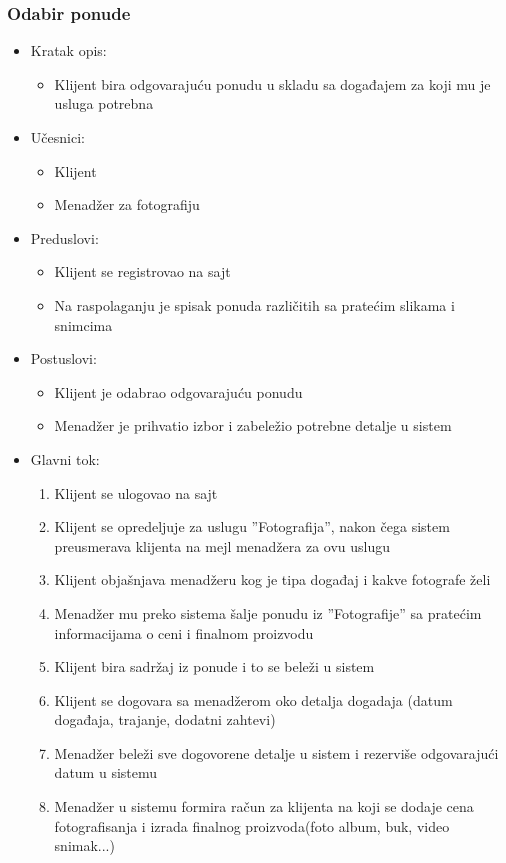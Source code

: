 \documentclass[a4paper]{article}
\begin{document}
\subsubsection{Odabir ponude}
\begin{itemize}
    \item Kratak opis: 
    \begin{itemize}
        \item Klijent bira odgovarajuću ponudu u skladu sa događajem za koji mu je usluga potrebna
    \end{itemize}
    \item Učesnici:
        \begin{itemize}
        \item Klijent
        \item Menadžer za fotografiju
    \end{itemize}
    \item Preduslovi:
        \begin{itemize}
            \item Klijent se registrovao na sajt
            \item Na raspolaganju je spisak ponuda različitih sa pratećim slikama i snimcima
        \end{itemize}
    \item Postuslovi:
        \begin{itemize}
            \item Klijent je odabrao odgovarajuću ponudu
            \item Menadžer je prihvatio izbor i zabeležio potrebne detalje u sistem
        \end{itemize}
    \item Glavni tok:
        \begin{enumerate}
            \item Klijent se ulogovao na sajt
            \item Klijent se opredeljuje za uslugu ''Fotografija'', nakon čega sistem preusmerava klijenta na mejl menadžera za ovu uslugu
            \item Klijent objašnjava menadžeru kog je tipa događaj i kakve fotografe želi
            \item Menadžer mu preko sistema šalje ponudu iz ''Fotografije'' sa pratećim informacijama o ceni i finalnom proizvodu 
            \item Klijent bira sadržaj iz ponude i to se beleži u sistem 
            \item Klijent se dogovara sa menadžerom oko detalja dogadaja (datum događaja, trajanje, dodatni zahtevi)
            \item Menadžer beleži sve dogovorene detalje u sistem i rezerviše odgovarajući datum u sistemu
            \item Menadžer u sistemu formira račun za klijenta na koji se dodaje cena fotografisanja i izrada finalnog proizvoda(foto album, buk, video snimak...)
        \end{enumerate}
        
\end{itemize}
\end{document}
